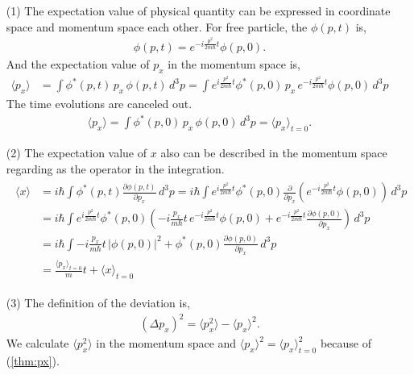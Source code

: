 \documentclass[floatfix,nofootinbib,superscriptaddress,fleqn]{revtex4}
\begin{document}
\begin{itemize}
  \item[(1)]The expectation value of physical quantity can be 
  expressed in coordinate space and momentum space each other.
  For free particle, the $\phi(p,t)$ is,
  \begin{align}\label{phi:te}
    \phi(p,t)=e^{-i\frac{p^2}{2m\hbar}t}\phi(p,0)  .
  \end{align}
  And the expectation value of $p_x$ in the momentum space is,
  \begin{align*}
    \langle p_x \rangle &= \int \phi^*(p,t)\,p_x\,\phi(p,t)\,d^3p
    =\int e^{i\frac{p^2}{2m\hbar}t}\phi^*(p,0)\,p_x\,
    e^{-i\frac{p^2}{2m\hbar}t}\phi(p,0)\,d^3p
  \end{align*}
  The time evolutions are canceled out.
  \begin{align}\label{thm:px}
    \langle p_x \rangle=\int \phi^*(p,0)\,p_x\,\phi(p,0)\,d^3p 
    = \langle p_x \rangle_{t=0}.
  \end{align}
  \item[(2)] The expectation value of $x$ also can be described in 
  the momentum space regarding as the operator in the integration.
  \begin{align*}
    \begin{split}
      \langle x\rangle &= i\hbar\int \phi^*(p,t)
      \frac{\partial\phi(p,t)}{\partial p_x}\,d^3p 
    =i\hbar\int e^{i\frac{p^2}{2m\hbar}t}\phi^*(p,0)
    \frac{\partial}{\partial p_x}\left(e^{-i
    \frac{p^2}{2m\hbar}t}\phi(p,0)\right)\,d^3p  \\
    &=i\hbar\int e^{i\frac{p^2}{2m\hbar}t}\phi^*(p,0)
    \left(-i\frac{p_x}{m\hbar}t\,e^{-i\frac{p^2}{2m\hbar}t}\phi(p,0)
    +e^{-i\frac{p^2}{2m\hbar}t}
    \frac{\partial \phi(p,0)}{\partial p_x}\right)\,d^3p \\
    &=i\hbar\int -i\frac{p_x}{m\hbar}t\,|\phi(p,0)|^2
    +\phi^*(p,0)\frac{\partial \phi(p,0)}{\partial p_x}\,d^3p \\
    &=\frac{\langle p_x\rangle_{t=0}}{m}t+\langle x\rangle_{t=0} 
    \end{split}
  \end{align*}
  \item[(3)] The definition of the deviation is,
  \begin{align}\label{def:deviation}
    (\Delta p_x)^2 = \langle p_x^2 \rangle-\langle p_x \rangle^2. 
  \end{align}
  We calculate $\langle p_x^2 \rangle$ in the momentum space 
  and $\langle p_x \rangle^2=\langle p_x \rangle^2_{t=0}$ because of (\ref{thm:px}).

\end{itemize}
\end{document}
